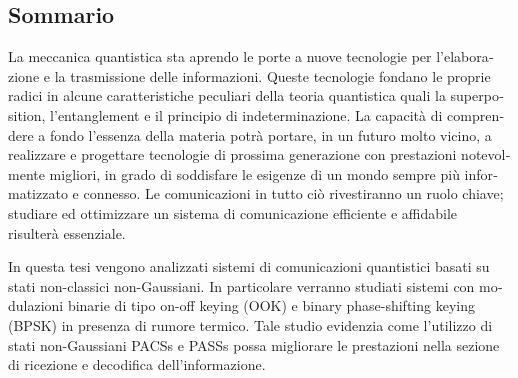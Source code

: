 
\begin{otherlanguage}{italian}
\chapter*{Sommario}
    La meccanica quantistica sta aprendo le porte a nuove tecnologie per l'elaborazione e 
    la trasmissione delle informazioni. Queste tecnologie fondano le proprie radici
    in alcune caratteristiche peculiari della teoria quantistica quali la \foreignlanguage{english}{
    superposition}, l'\foreignlanguage{english}{entanglement} e il principio di indeterminazione.
    La capacità di comprendere a fondo l'essenza della materia potrà portare, 
    in un futuro molto vicino, a realizzare e progettare tecnologie di prossima generazione
    con prestazioni notevolmente migliori, in grado di soddisfare le esigenze di un mondo sempre
    più informatizzato e connesso.
    Le comunicazioni in tutto ciò rivestiranno un ruolo chiave; studiare ed ottimizzare un sistema
    di comunicazione efficiente e affidabile risulterà essenziale.

    In questa tesi vengono analizzati sistemi di comunicazioni quantistici basati su stati non-classici 
    non-Gaussiani. In particolare verranno studiati sistemi con modulazioni binarie di tipo on-off 
    keying (OOK) e binary phase-shifting keying (BPSK) in presenza di rumore termico. Tale studio 
    evidenzia come l'utilizzo di stati non-Gaussiani PACSs e PASSs possa migliorare le prestazioni 
    nella sezione di ricezione e decodifica dell'informazione.
\end{otherlanguage}